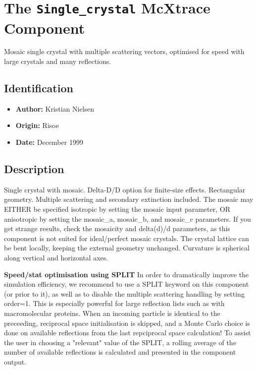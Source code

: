 \section{The \texttt{Single\_crystal} McXtrace Component}
Mosaic single crystal with multiple scattering vectors, optimised for speed
with large crystals and many reflections.

\subsection*{Identification}
\begin{itemize}
  \item \textbf{Author:} Kristian Nielsen
  \item \textbf{Origin:} Risoe
  \item \textbf{Date:} December 1999
\end{itemize}

\subsection*{Description}
Single crystal with mosaic. Delta-D/D option for finite-size effects. Rectangular geometry. Multiple scattering and secondary extinction included. The mosaic may EITHER be specified isotropic by setting the mosaic input parameter, OR anisotropic by setting the mosaic\_a, mosaic\_b, and mosaic\_c parameters. If you get strange results, check the mosaicity and delta(d)/d parameters, as this component is not suited for ideal/perfect mosaic crystals. The crystal lattice can be bent locally, keeping the external geometry unchanged. Curvature is spherical along vertical and horizontal axes.

\textbf{Speed/stat optimisation using SPLIT} In order to dramatically improve the simulation efficiency, we recommend to use a SPLIT keyword on this component (or prior to it), as well as to disable the multiple scattering handling by setting order=1. This is especially powerful for large reflection lists such as with macromolecular proteins. When an incoming particle is identical to the preceeding, reciprocal space initialisation is skipped, and a Monte Carlo choice is done on available reflections from the last repciprocal space calculation! To assist the user in choosing a "relevant" value of the SPLIT, a rolling average of the number of available reflections is calculated and presented in the component output.

